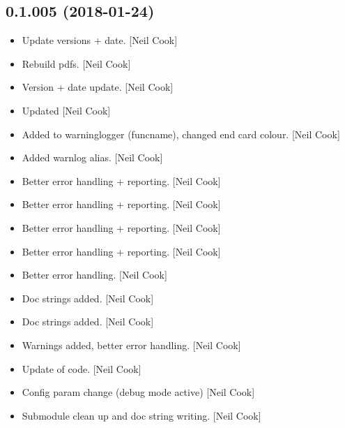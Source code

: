 \documentclass[a4paper,10pt,english]{report}
\begin{document}
\subsection{0.1.005 (2018-01-24)}
\label{\detokenize{misc/changelog:id498}}\begin{itemize}
\item {} 
Update versions + date. {[}Neil Cook{]}

\item {} 
Rebuild pdfs. {[}Neil Cook{]}

\item {} 
Version + date update. {[}Neil Cook{]}

\item {} 
Updated  {[}Neil Cook{]}

\item {} 
Added to warninglogger (funcname), changed end card colour. {[}Neil
Cook{]}

\item {} 
Added warnlog alias. {[}Neil Cook{]}

\item {} 
Better error handling + reporting. {[}Neil Cook{]}

\item {} 
Better error handling + reporting. {[}Neil Cook{]}

\item {} 
Better error handling + reporting. {[}Neil Cook{]}

\item {} 
Better error handling + reporting. {[}Neil Cook{]}

\item {} 
Better error handling. {[}Neil Cook{]}

\item {} 
Doc strings added. {[}Neil Cook{]}

\item {} 
Doc strings added. {[}Neil Cook{]}

\item {} 
Warnings added, better error handling. {[}Neil Cook{]}

\item {} 
Update of code. {[}Neil Cook{]}

\item {} 
Config param change (debug mode active) {[}Neil Cook{]}

\item {} 
Submodule clean up and doc string writing. {[}Neil Cook{]}


\end{itemize}
\end{document}
